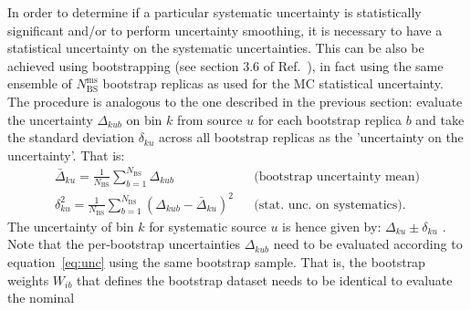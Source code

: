 In order to determine if a particular systematic uncertainty is statistically significant and/or to perform uncertainty smoothing, it is necessary to have a statistical uncertainty on the systematic uncertainties. This can be also be achieved using bootstrapping (see section 3.6 of Ref.~\cite{ATLAS-bootstrap}), in fact using the same ensemble of $N_\mathrm{BS}^\mathrm{ms}$ bootstrap replicas as used for the MC statistical uncertainty. The procedure is analogous to the one described in the previous section: evaluate the uncertainty $\Delta_{kub}$ on bin $k$ from source $u$ for each bootstrap replica $b$ and take the standard deviation $\delta_{ku}$ across all bootstrap replicas as the 'uncertainty on the uncertainty'. That is:
\begin{eqnarray}
  \label{eq:unc-on-unc}
  \bar{\Delta}_{ku} = \frac{1}{N_\mathrm{BS}}\sum_{b=1}^{N_\mathrm{BS}} \Delta_{kub} 
  & & \text{(bootstrap uncertainty mean)}\\
  \delta_{ku}^2 = \frac{1}{N_\mathrm{BS}}\sum_{b=1}^{N_\mathrm{BS}} \left(\Delta_{kub} - \bar{\Delta}_{ku}\right)^2 
  & & \text{(stat.~unc.~on systematics)}.
\end{eqnarray}
The uncertainty of bin $k$ for systematic source $u$ is hence given by: $\Delta_{ku} \pm \delta_{ku}$ . 
Note that the per-bootstrap uncertainties $\Delta_{kub}$ need to be evaluated according to equation~\ref{eq:unc} using the same bootstrap sample.
That is, the bootstrap weights $W_{ib}$ that defines the bootstrap dataset needs to be identical to evaluate the nominal 
